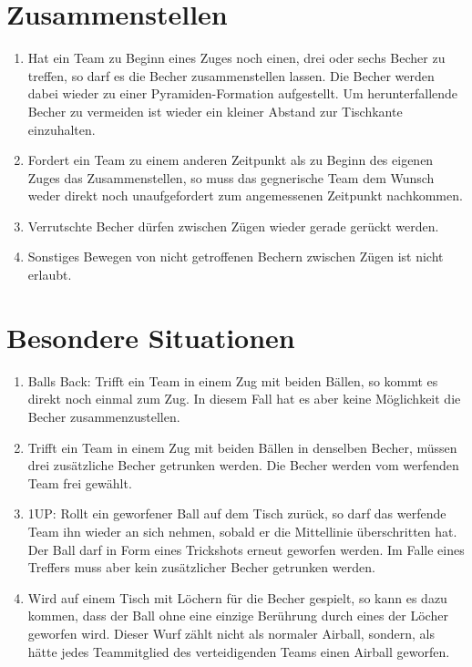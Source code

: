 \section{Zusammenstellen}
\begin{enumerate}[label={(\arabic*)}]
    \item
    Hat ein Team zu Beginn eines Zuges noch einen, drei oder sechs Becher zu treffen, so darf es die Becher zusammenstellen lassen.
    Die Becher werden dabei wieder zu einer Pyramiden-Formation aufgestellt.
    Um herunterfallende Becher zu vermeiden ist wieder ein kleiner Abstand zur Tischkante einzuhalten.

    \item
    Fordert ein Team zu einem anderen Zeitpunkt als zu Beginn des eigenen Zuges das Zusammenstellen, so muss das gegnerische Team dem Wunsch weder direkt noch unaufgefordert zum angemessenen Zeitpunkt nachkommen.

    \item
    Verrutschte Becher dürfen zwischen Zügen wieder gerade gerückt werden.

    \item
    Sonstiges Bewegen von nicht getroffenen Bechern zwischen Zügen ist nicht erlaubt.
\end{enumerate}

\section{Besondere Situationen}
\begin{enumerate}[label={(\arabic*)}]
    \item
    \glqq{}Balls Back\grqq{}: Trifft ein Team in einem Zug mit beiden Bällen, so kommt es direkt noch einmal zum Zug.
    In diesem Fall hat es aber keine Möglichkeit die Becher zusammenzustellen.

    \item
    Trifft ein Team in einem Zug mit beiden Bällen in denselben Becher, müssen drei zusätzliche Becher getrunken werden.
    Die Becher werden vom werfenden Team frei gewählt.

    \item
    \glqq{}1UP\grqq{}: Rollt ein geworfener Ball auf dem Tisch zurück, so darf das werfende Team ihn wieder an sich nehmen, sobald er die Mittellinie überschritten hat.
    Der Ball darf in Form eines Trickshots erneut geworfen werden.
    Im Falle eines Treffers muss aber kein zusätzlicher Becher getrunken werden.

    \item
    Wird auf einem Tisch mit Löchern für die Becher gespielt, so kann es dazu kommen, dass der Ball ohne eine einzige Berührung durch eines der Löcher geworfen wird.
    Dieser Wurf zählt nicht als normaler Airball, sondern, als hätte jedes Teammitglied des verteidigenden Teams einen Airball geworfen.
\end{enumerate}

